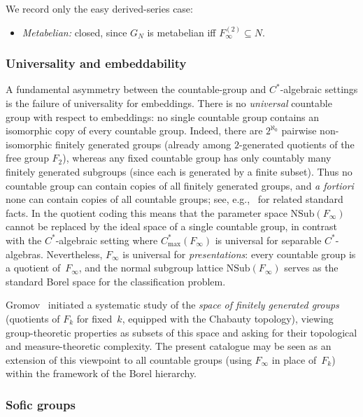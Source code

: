\documentclass[12pt,fleqn,a4paper]{amsart}
\numberwithin{equation}{section}
\theoremstyle{definition}
\newcommand{\NSub}{\mathrm{NSub}}
\begin{document}
We record only the easy derived-series case:
\begin{itemize}
\item \emph{Metabelian:} closed, since $G_N$ is metabelian iff
$F_\infty^{(2)}\subseteq N$.
\end{itemize}

\subsubsection{Universality and embeddability}

A fundamental asymmetry between the countable-group and $C^*$-algebraic settings
is the failure of universality for embeddings.
There is no \emph{universal} countable group with respect to embeddings: no single
countable group contains an isomorphic copy of every countable group.
Indeed, there are $2^{\aleph_0}$ pairwise non-isomorphic finitely generated groups
(already among $2$-generated quotients of the free group $F_2$), whereas any
fixed countable group has only countably many finitely generated subgroups
(since each is generated by a finite subset).
Thus no countable group can contain copies of all finitely generated groups,
and \emph{a fortiori} none can contain copies of all countable groups;
see, e.g.,~\cite[Chapter~IV]{LyndonSchupp} for related standard facts.
In the quotient coding this means that the parameter space $\NSub(F_\infty)$ cannot
be replaced by the ideal space of a single countable group, in contrast with the
$C^*$-algebraic setting where $C^*_{\max}(F_\infty)$ is universal for separable
$C^*$-algebras.
Nevertheless, $F_\infty$ is universal for \emph{presentations}: every countable group
is a quotient of~$F_\infty$, and the normal subgroup lattice $\NSub(F_\infty)$
serves as the standard Borel space for the classification problem.

Gromov~\cite{Gromov1999} initiated a systematic study of the \emph{space of
finitely generated groups} (quotients of $F_k$ for fixed~$k$, equipped with the
Chabauty topology), viewing group-theoretic properties as subsets of this space
and asking for their topological and measure-theoretic complexity.
The present catalogue may be seen as an extension of this viewpoint to all
countable groups (using $F_\infty$ in place of~$F_k$) within the framework
of the Borel hierarchy.

\subsubsection{Sofic groups}
\end{document}

